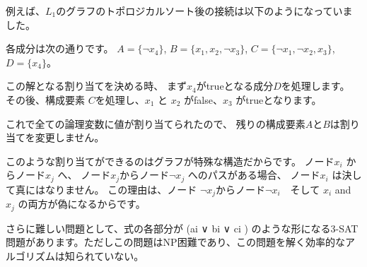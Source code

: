 例えば、$L_1$のグラフのトポロジカルソート後の接続は以下のようになっていました。
\begin{center}
\end{center}

各成分は次の通りです。
$A = \{\lnot x_4\}$,
$B = \{x_1, x_2, \lnot x_3\}$,
$C = \{\lnot x_1, \lnot x_2, x_3\}$,
$D = \{x_4\}$。

この解となる割り当てを決める時、
まず$x_4$がtrueとなる成分$D$を処理します。
その後、構成要素 $C$を処理し、$x_1$ と $x_2$ がfalse、$x_3$ がtrueとなります。

これで全ての論理変数に値が割り当てられたので、
残りの構成要素$A$と$B$は割り当てを変更しません。

このような割り当てができるのはグラフが特殊な構造だからです。
ノード$x_i$  からノード$x_j$  へ、
ノード$x_j$からノード$\lnot x_j$ へのパスがある場合、
ノード$x_i$ は決して真にはなりません。
この理由は、ノード
 $\lnot x_j$からノード$\lnot x_i$　そして $x_i$ and $x_j$  の両方が偽になるからです。


さらに難しい問題として、式の各部分が (ai ∨ bi ∨ ci ) のような形になる3-SAT
問題があります。ただしこの問題はNP困難であり、この問題を解く効率的なアルゴリズムは知られていない。

